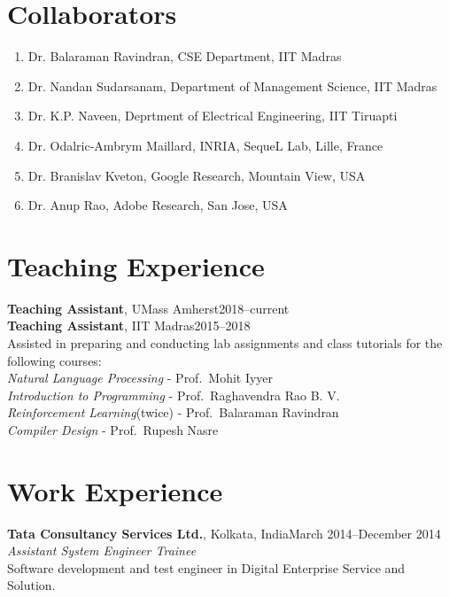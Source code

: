 \documentclass[margin,11pt]{res}
\begin{document}
\begin{resume}

\section{Collaborators}
\begin{enumerate}
\item Dr. Balaraman Ravindran, CSE Department, IIT Madras
\item Dr. Nandan Sudarsanam, Department of Management Science, IIT Madras
\item Dr. K.P. Naveen, Deprtment of Electrical Engineering, IIT Tiruapti
\item Dr. Odalric-Ambrym Maillard, INRIA, SequeL Lab, Lille, France
\item Dr. Branislav Kveton, Google Research, Mountain View, USA
\item Dr. Anup Rao, Adobe Research, San Jose, USA
\end{enumerate}

\section{Teaching Experience}
\par
\textbf{Teaching Assistant}, UMass Amherst\hfill 2018--current\\
\textbf{Teaching Assistant}, IIT Madras\hfill 2015--2018\\
Assisted in preparing and conducting lab assignments and class tutorials for the following courses:\\
\textit{Natural Language Processing} - Prof.~Mohit Iyyer\\
\textit{Introduction to Programming} - Prof.~Raghavendra Rao B. V. \\
\textit{Reinforcement Learning}(twice) - Prof.~Balaraman Ravindran\\
\textit{Compiler Design} - Prof.~Rupesh Nasre

\section{Work Experience}
\textbf{Tata Consultancy Services Ltd.}, Kolkata, India\hfill March 2014--December 2014\\
\textit{Assistant System Engineer Trainee}\\
Software development and test engineer in Digital Enterprise Service and Solution.


\end{resume}
\end{document}
